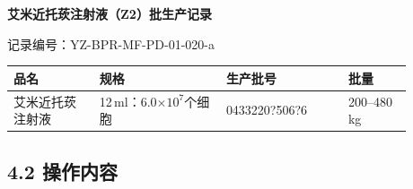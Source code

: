 \documentclass[UTF8,10pt,a4paper,fontset=fandol]{ctexart}
\newcommand{\fieldvalue}[1]{#1}
\newcommand{\handwritten}[1]{#1}
\begin{document}
\newpage

\begin{center}
\textbf{艾米近托莰注射液（Z2）批生产记录}
\end{center}

记录编号：YZ-BPR-MF-PD-01-020-a

\begin{tabular}{|p{0.19\linewidth}|p{0.28\linewidth}|p{0.27\linewidth}|p{0.14\linewidth}|}
\hline
品名 & 规格 & 生产批号 & 批量 \\
\hline
艾米近托莰注射液 & 12\,ml：6.0$\times 10^7$个细胞 &
\fieldvalue{\handwritten{0433220?506?6}} &
200--480 kg \\
\hline
\end{tabular}

\subsection*{4.2 操作内容}
\end{document}
